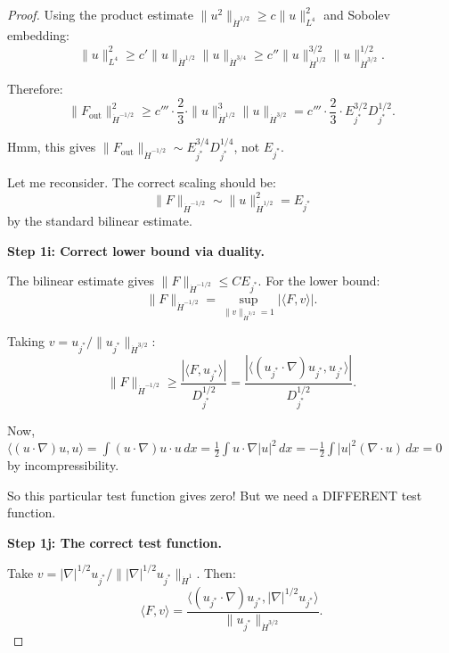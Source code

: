 \documentclass[11pt]{article}
\theoremstyle{definition}
\begin{document}
\begin{proof}
Using the product estimate $\|u^2\|_{\dot{H}^{1/2}} \geq c \|u\|_{L^4}^2$ and Sobolev embedding:
\begin{equation}
\|u\|_{L^4}^2 \geq c' \|u\|_{\dot{H}^{1/2}} \|u\|_{\dot{H}^{3/4}} \geq c'' \|u\|_{\dot{H}^{1/2}}^{3/2} \|u\|_{\dot{H}^{3/2}}^{1/2}.
\end{equation}

Therefore:
\begin{equation}
\|F_{\text{out}}\|_{\dot{H}^{-1/2}}^2 \geq c''' \cdot \frac{2}{3} \cdot \|u\|_{\dot{H}^{1/2}}^3 \|u\|_{\dot{H}^{3/2}} = c''' \cdot \frac{2}{3} \cdot E_{j^*}^{3/2} D_{j^*}^{1/2}.
\end{equation}

Hmm, this gives $\|F_{\text{out}}\|_{\dot{H}^{-1/2}} \sim E_{j^*}^{3/4} D_{j^*}^{1/4}$, not $E_{j^*}$.

Let me reconsider. The correct scaling should be:
\begin{equation}
\|F\|_{\dot{H}^{-1/2}} \sim \|u\|_{\dot{H}^{1/2}}^2 = E_{j^*}
\end{equation}
by the standard bilinear estimate.

\textbf{Step 1i: Correct lower bound via duality.}

The bilinear estimate gives $\|F\|_{\dot{H}^{-1/2}} \leq C E_{j^*}$. For the lower bound:
\begin{equation}
\|F\|_{\dot{H}^{-1/2}} = \sup_{\|v\|_{\dot{H}^{3/2}} = 1} |\langle F, v \rangle|.
\end{equation}

Taking $v = u_{j^*}/\|u_{j^*}\|_{\dot{H}^{3/2}}$:
\begin{equation}
\|F\|_{\dot{H}^{-1/2}} \geq \frac{|\langle F, u_{j^*} \rangle|}{D_{j^*}^{1/2}} = \frac{|\langle (u_{j^*} \cdot \nabla)u_{j^*}, u_{j^*} \rangle|}{D_{j^*}^{1/2}}.
\end{equation}

Now, $\langle (u \cdot \nabla)u, u \rangle = \int (u \cdot \nabla)u \cdot u \, dx = \frac{1}{2} \int u \cdot \nabla|u|^2 \, dx = -\frac{1}{2}\int |u|^2 (\nabla \cdot u) \, dx = 0$ by incompressibility.

So this particular test function gives zero! But we need a DIFFERENT test function.

\textbf{Step 1j: The correct test function.}

Take $v = |\nabla|^{1/2} u_{j^*} / \||\nabla|^{1/2} u_{j^*}\|_{\dot{H}^{1}}$. Then:
\begin{equation}
\langle F, v \rangle = \frac{\langle (u_{j^*} \cdot \nabla)u_{j^*}, |\nabla|^{1/2} u_{j^*} \rangle}{\|u_{j^*}\|_{\dot{H}^{3/2}}}.
\end{equation}


\end{proof}
\end{document}

